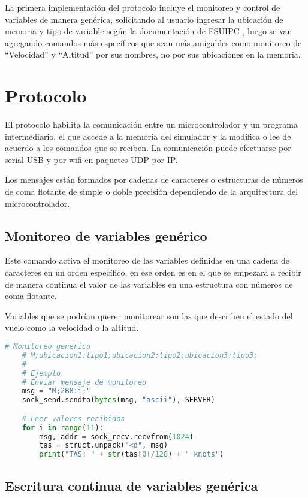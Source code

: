 La primera implementación del protocolo incluye el monitoreo y control de variables de manera genérica, solicitando al usuario ingresar la ubicación de memoria y tipo de variable según la documentación de FSUIPC \cite{fsuipcoffsets}, luego se van agregando comandos más específicos que sean más amigables como monitoreo de ``Velocidad'' y ``Altitud'' por sus nombres, no por sus ubicaciones en la memoria.

\section{Protocolo}

El protocolo habilita la comunicación entre un microcontrolador y un programa intermediario, el que accede a la memoria del simulador y la modifica o lee de acuerdo a los comandos que se reciben. La comunicación puede efectuarse por serial USB y por wifi en paquetes UDP por IP.

Los mensajes están formados por cadenas de caracteres o estructuras de números de coma flotante de simple o doble precisión dependiendo de la arquitectura del microcontrolador.

\subsection{Monitoreo de variables genérico}

Este comando activa el monitoreo de las variables definidas en una cadena de caracteres en un orden específico, en ese orden es en el que se empezara a recibir de manera continua el valor de las variables en una estructura con números de coma flotante.

Variables que se podrían querer monitorear son las que describen el estado del vuelo como la velocidad o la altitud.

\begin{lstlisting}[language=Python]
	# Monitoreo generico
	# M;ubicacion1:tipo1;ubicacion2:tipo2;ubicacion3:tipo3;
	#
	# Ejemplo
	# Enviar mensaje de monitoreo
	msg = "M;2B8:i;"
	sock_send.sendto(bytes(msg, "ascii"), SERVER)

	# Leer valores recibidos
	for i in range(11):
		msg, addr = sock_recv.recvfrom(1024)
		tas = struct.unpack("<d", msg)
		print("TAS: " + str(tas[0]/128) + " knots")
\end{lstlisting}


\subsection{Escritura continua de variables genérica}

